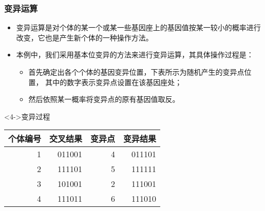 \documentclass{beamer}
\begin{document}
\begin{frame}
\frametitle{变异运算}
\label{sec-2-7}

\begin{itemize}
\item <2-> 变异运算是对个体的某一个或某一些基因座上的基因值按某一较小的概率进行改变，它也是产生新个体的一种操作方法。
\item <3-> 本例中，我们采用基本位变异的方法来进行变异运算，其具体操作过程是：
\begin{itemize}
\item 首先确定出各个个体的基因变异位置，下表所示为随机产生的变异点位置，
          其中的数字表示变异点设置在该基因座处；
\item 然后依照某一概率将变异点的原有基因值取反。
\end{itemize}
\end{itemize}
\begin{block}<4->{变异过程}
\label{sec-2-7-1}


\begin{center}
\begin{tabular}{rrrr}
 个体编号  &  交叉结果  &  变异点  &  变异结果  \\
\hline
        1  &    011001  &       4  &    011101  \\
        2  &    111101  &       5  &    111111  \\
        3  &    101001  &       2  &    111001  \\
        4  &    111011  &       6  &    111010  \\
\end{tabular}
\end{center}
\end{block}
\end{frame}
\end{document}
